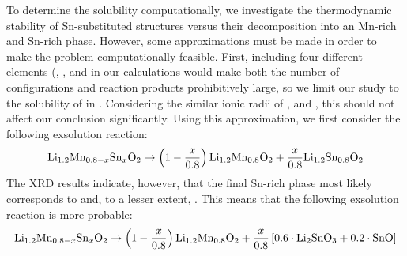 \begin{refsection}
To determine the  solubility computationally, we investigate the thermodynamic stability of Sn-substituted structures versus their decomposition into an Mn-rich and Sn-rich phase. However, some approximations must be made in order to make the problem computationally feasible. First, including four different elements (, ,  and  in our calculations would make both the number of configurations and reaction products prohibitively large, so we limit our study to the solubility of  in . Considering the similar ionic radii of ,  and , this should not affect our conclusion significantly. Using this approximation, we first consider the following exsolution reaction:
\begin{equation}
 \ce{Li_{1.2}Mn_{0.8-x}Sn_xO2} \rightarrow  \left( 1 - \frac{x}{0.8} \right) \ce{Li_{1.2}Mn_{0.8}O2} +  \frac{x}{0.8} \ce{Li_{1.2}Sn_{0.8}O2} 
\end{equation}
The XRD results indicate, however, that the final Sn-rich phase most likely corresponds to  and, to a lesser extent, . This means that the following exsolution reaction is more probable:
\begin{equation} \label{batteries:eq-exsolution}
 \ce{Li_{1.2}Mn_{0.8-x}Sn_xO2} \rightarrow  \left( 1 - \frac{x}{0.8} \right) \ce{Li_{1.2}Mn_{0.8}O2} +  \frac{x}{0.8} \left[  0.6 \cdot \ce{Li2SnO3} + 0.2 \cdot \ce{SnO} \right]
\end{equation}


\end{refsection}

